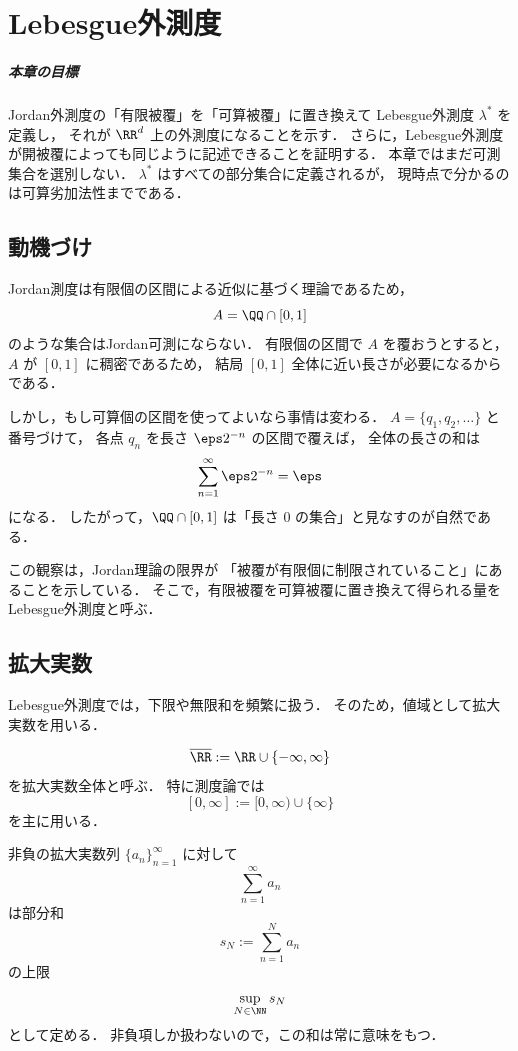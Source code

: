 \chapter{Lebesgue外測度}

\paragraph{本章の目標}
Jordan外測度の「有限被覆」を「可算被覆」に置き換えて
Lebesgue外測度 $\lambda^*$ を定義し，
それが $\RR^d$ 上の外測度になることを示す．
さらに，Lebesgue外測度が開被覆によっても同じように記述できることを証明する．
本章ではまだ可測集合を選別しない．
$\lambda^*$ はすべての部分集合に定義されるが，
現時点で分かるのは可算劣加法性までである．

\section{動機づけ}

Jordan測度は有限個の区間による近似に基づく理論であるため，
\[
A = \QQ \cap [0,1]
\]
のような集合はJordan可測にならない．
有限個の区間で $A$ を覆おうとすると，
$A$ が $[0,1]$ に稠密であるため，
結局 $[0,1]$ 全体に近い長さが必要になるからである．

しかし，もし可算個の区間を使ってよいなら事情は変わる．
$A=\{q_1,q_2,\dots\}$ と番号づけて，
各点 $q_n$ を長さ $\eps 2^{-n}$ の区間で覆えば，
全体の長さの和は
\[
\sum_{n=1}^{\infty} \eps 2^{-n} = \eps
\]
になる．
したがって，$\QQ \cap [0,1]$ は「長さ $0$ の集合」と見なすのが自然である．

この観察は，Jordan理論の限界が
「被覆が有限個に制限されていること」にあることを示している．
そこで，有限被覆を可算被覆に置き換えて得られる量を
Lebesgue外測度と呼ぶ．

\section{拡大実数}

Lebesgue外測度では，下限や無限和を頻繁に扱う．
そのため，値域として拡大実数を用いる．

\begin{definition}[拡大実数]
\[
\overline{\RR}:=\RR \cup \{-\infty,\infty\}
\]
を拡大実数全体と呼ぶ．
特に測度論では
\[
[0,\infty]:=[0,\infty)\cup\{\infty\}
\]
を主に用いる．
\end{definition}

\begin{remark}
非負の拡大実数列 $\{a_n\}_{n=1}^{\infty}$ に対して
\[
\sum_{n=1}^{\infty} a_n
\]
は部分和
\[
s_N:=\sum_{n=1}^N a_n
\]
の上限
\[
\sup_{N \in \NN} s_N
\]
として定める．
非負項しか扱わないので，この和は常に意味をもつ．
\end{remark}

